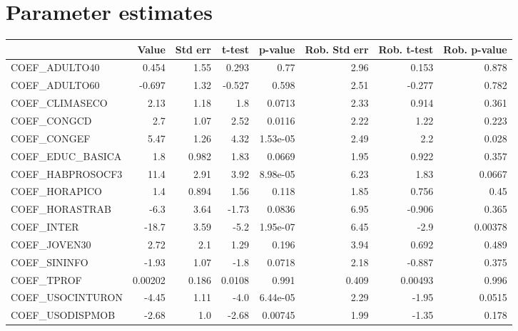 \section{Parameter estimates}
\begin{tabular}{lrrrrrrr}
\toprule
{} &   Value &  Std err &  t-test &  p-value &  Rob. Std err &  Rob. t-test &  Rob. p-value \\
\midrule
COEF\_ADULTO40      &   0.454 &     1.55 &   0.293 &     0.77 &          2.96 &        0.153 &         0.878 \\
COEF\_ADULTO60      &  -0.697 &     1.32 &  -0.527 &    0.598 &          2.51 &       -0.277 &         0.782 \\
COEF\_CLIMASECO     &    2.13 &     1.18 &     1.8 &   0.0713 &          2.33 &        0.914 &         0.361 \\
COEF\_CONGCD        &     2.7 &     1.07 &    2.52 &   0.0116 &          2.22 &         1.22 &         0.223 \\
COEF\_CONGEF        &    5.47 &     1.26 &    4.32 & 1.53e-05 &          2.49 &          2.2 &         0.028 \\
COEF\_EDUC\_BASICA   &     1.8 &    0.982 &    1.83 &   0.0669 &          1.95 &        0.922 &         0.357 \\
COEF\_HABPROSOCF3   &    11.4 &     2.91 &    3.92 & 8.98e-05 &          6.23 &         1.83 &        0.0667 \\
COEF\_HORAPICO      &     1.4 &    0.894 &    1.56 &    0.118 &          1.85 &        0.756 &          0.45 \\
COEF\_HORASTRAB     &    -6.3 &     3.64 &   -1.73 &   0.0836 &          6.95 &       -0.906 &         0.365 \\
COEF\_INTER         &   -18.7 &     3.59 &    -5.2 & 1.95e-07 &          6.45 &         -2.9 &       0.00378 \\
COEF\_JOVEN30       &    2.72 &      2.1 &    1.29 &    0.196 &          3.94 &        0.692 &         0.489 \\
COEF\_SININFO       &   -1.93 &     1.07 &    -1.8 &   0.0718 &          2.18 &       -0.887 &         0.375 \\
COEF\_TPROF         & 0.00202 &    0.186 &  0.0108 &    0.991 &         0.409 &      0.00493 &         0.996 \\
COEF\_USOCINTURON   &   -4.45 &     1.11 &    -4.0 & 6.44e-05 &          2.29 &        -1.95 &        0.0515 \\
COEF\_USODISPMOB    &   -2.68 &      1.0 &   -2.68 &  0.00745 &          1.99 &        -1.35 &         0.178 \\

\end{tabular}
